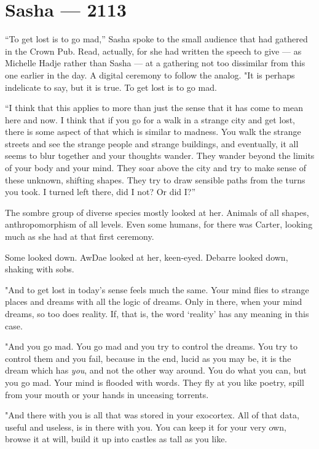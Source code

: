 \hypertarget{sasha-2113}{%
\chapter*{Sasha — 2113}\label{sasha-2113}}

``To get lost is to go mad,'' Sasha spoke to the small audience that had gathered in the Crown Pub. Read, actually, for she had written the speech to give — as Michelle Hadje rather than Sasha — at a gathering not too dissimilar from this one earlier in the day. A digital ceremony to follow the analog. "It is perhaps indelicate to say, but it is true. To get lost is to go mad.

``I think that this applies to more than just the sense that it has come to mean here and now. I think that if you go for a walk in a strange city and get lost, there is some aspect of that which is similar to madness. You walk the strange streets and see the strange people and strange buildings, and eventually, it all seems to blur together and your thoughts wander. They wander beyond the limits of your body and your mind. They soar above the city and try to make sense of these unknown, shifting shapes. They try to draw sensible paths from the turns you took. I turned left there, did I not? Or did I?''

The sombre group of diverse species mostly looked at her. Animals of all shapes, anthropomorphism of all levels. Even some humans, for there was Carter, looking much as she had at that first ceremony.

Some looked down. AwDae looked at her, keen-eyed. Debarre looked down, shaking with sobs.

"And to get lost in today's sense feels much the same. Your mind flies to strange places and dreams with all the logic of dreams. Only in there, when your mind dreams, so too does reality. If, that is, the word `reality' has any meaning in this case.

"And you go mad. You go mad and you try to control the dreams. You try to control them and you fail, because in the end, lucid as you may be, it is the dream which has \emph{you}, and not the other way around. You do what you can, but you go mad. Your mind is flooded with words. They fly at you like poetry, spill from your mouth or your hands in unceasing torrents.

"And there with you is all that was stored in your exocortex. All of that data, useful and useless, is in there with you. You can keep it for your very own, browse it at will, build it up into castles as tall as you like.

